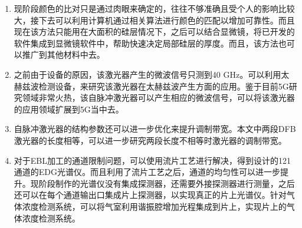 \begin{enumerate}[(1)]
	\item 
	现阶段颜色的比对只是通过肉眼来确定的，往往不够准确且受个人的影响比较大，接下去可以利用计算机通过相关算法进行颜色的匹配以增加可靠性。而且现在该方法只能用在大面积的硅层情况下，之后可以结合显微镜，将已开发的软件集成到显微镜软件中，帮助快速决定局部硅层的厚度。而且，该方法也可以推广到其他材料中去。
	\item 
	之前由于设备的原因，该激光器产生的微波信号只测到40 GHz。可以利用太赫兹波检测设备，来研究该激光器在太赫兹波产生方面的应用。鉴于目前5G研究领域非常火热，该自脉冲激光器可以产生相应的微波信号，可以将该激光器的应用领域扩展到5G当中去。
	\item 自脉冲激光器的结构参数还可以进一步优化来提升调制带宽。本文中两段DFB激光器的长度相等，可以进一步研究两段长度不相等时激光器的调制带宽。
	\item 
	对于EBL加工的通道限制问题，可以使用流片工艺进行解决，得到设计的121通道的EDG光谱仪。而且利用了流片工艺之后，通道的均匀性可以进一步提升。现阶段制作的光谱仪没有集成探测器，还需要外接探测器进行测量，之后还可以在每个通道输出口集成片上探测器，以实现真正的片上光谱仪。针对气体浓度检测系统，可以将气室利用谐振腔增加光程集成到片上，实现片上的气体浓度检测系统。
\end{enumerate}